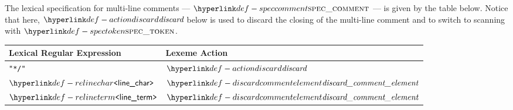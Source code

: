 \hypertarget{def-speccomment}{}
The lexical specification for multi-line comments --- $\speccomment$ --- is given by the table below.
%
Notice that here, $\actiondiscard$ below is used to discard the closing of the multi-line comment and to switch
to scanning with $\spectoken$.

\begin{center}
\begin{tabular}{ll}
\textbf{Lexical Regular Expression} & \textbf{Lexeme Action}\\
\hline
\texttt{"*/"} & $\actiondiscard$ \\
$\RElinechar$ & $\discardcommentelement$ \\
$\RElineterm$ & $\discardcommentelement$ \\
\hline
\end{tabular}
\end{center}
